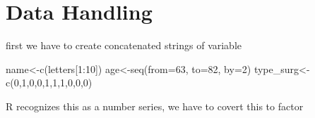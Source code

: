 \documentclass[
]{article}
\newenvironment{Shaded}{\begin{snugshade}}{\end{snugshade}}
\newcommand{\AttributeTok}[1]{\textcolor[rgb]{0.77,0.63,0.00}{#1}}
\newcommand{\DecValTok}[1]{\textcolor[rgb]{0.00,0.00,0.81}{#1}}
\newcommand{\FunctionTok}[1]{\textcolor[rgb]{0.00,0.00,0.00}{#1}}
\newcommand{\NormalTok}[1]{#1}
\newcommand{\OtherTok}[1]{\textcolor[rgb]{0.56,0.35,0.01}{#1}}
\newcommand{\SpecialCharTok}[1]{\textcolor[rgb]{0.00,0.00,0.00}{#1}}
\begin{document}
\hypertarget{data-handling}{%
\section{Data Handling}\label{data-handling}}

first we have to create concatenated strings of variable

\begin{Shaded}
\begin{Highlighting}[]
\NormalTok{name}\OtherTok{\textless{}{-}}\FunctionTok{c}\NormalTok{(letters[}\DecValTok{1}\SpecialCharTok{:}\DecValTok{10}\NormalTok{])}
\NormalTok{age}\OtherTok{\textless{}{-}}\FunctionTok{seq}\NormalTok{(}\AttributeTok{from=}\DecValTok{63}\NormalTok{, }\AttributeTok{to=}\DecValTok{82}\NormalTok{, }\AttributeTok{by=}\DecValTok{2}\NormalTok{)}
\NormalTok{type\_surg}\OtherTok{\textless{}{-}} \FunctionTok{c}\NormalTok{(}\DecValTok{0}\NormalTok{,}\DecValTok{1}\NormalTok{,}\DecValTok{0}\NormalTok{,}\DecValTok{0}\NormalTok{,}\DecValTok{1}\NormalTok{,}\DecValTok{1}\NormalTok{,}\DecValTok{1}\NormalTok{,}\DecValTok{0}\NormalTok{,}\DecValTok{0}\NormalTok{,}\DecValTok{0}\NormalTok{)}
\end{Highlighting}
\end{Shaded}

R recognizes this as a number series, we have to covert this to factor
\end{document}
